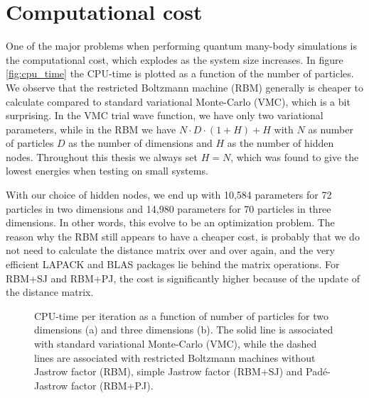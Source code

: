 \section{Computational cost}
One of the major problems when performing quantum many-body simulations is the computational cost, which explodes as the system size increases. In figure \eqref{fig:cpu_time} the CPU-time is plotted as a function of the number of particles. We observe that the restricted Boltzmann machine (RBM) generally is cheaper to calculate compared to standard variational Monte-Carlo (VMC), which is a bit surprising. In the VMC trial wave function, we have only two variational parameters, while in the RBM we have $N\cdot D\cdot (1+H)+H$ with $N$ as number of particles $D$ as the number of dimensions and $H$ as the number of hidden nodes. Throughout this thesis we always set $H=N$, which was found to give the lowest energies when testing on small systems. \cite{nordhagen_computational_2018} 

With our choice of hidden nodes, we end up with 10,584 parameters for 72 particles in two dimensions and 14,980 parameters for 70 particles in three dimensions. In other words, this evolve to be an optimization problem. The reason why the RBM still appears to have a cheaper cost, is probably that we do not need to calculate the distance matrix over and over again, and the very efficient LAPACK and BLAS packages lie behind the matrix operations. For RBM+SJ and RBM+PJ, the cost is significantly higher because of the update of the distance matrix.

\begin{figure}
	\centering 
	\subfloat[2D]{{}}
	\subfloat[3D]{{}}
	\caption{CPU-time per iteration as a function of number of particles for two dimensions (a) and three dimensions (b). The solid line is associated with standard variational Monte-Carlo (VMC), while the dashed lines are associated with restricted Boltzmann machines without Jastrow factor (RBM), simple Jastrow factor (RBM+SJ) and Padé-Jastrow factor (RBM+PJ).}
	\label{fig:cpu_time}
\end{figure} 

